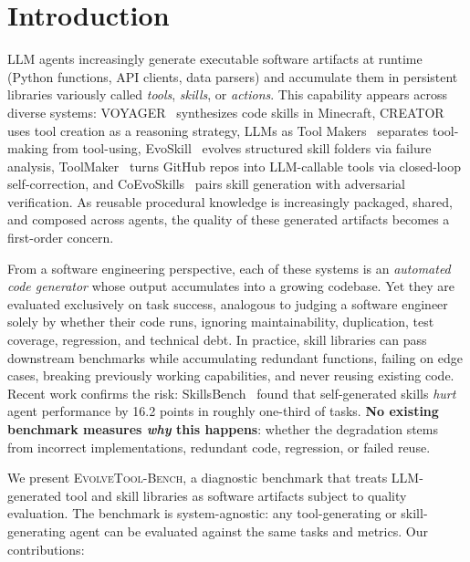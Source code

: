 \documentclass[sigconf,anonymous,review,natbib=false]{acmart}
\begin{document}
\maketitle

\section{Introduction}

LLM agents increasingly generate executable software artifacts at runtime (Python functions, API clients, data parsers) and accumulate them in persistent libraries variously called \emph{tools}, \emph{skills}, or \emph{actions}. This capability appears across diverse systems: VOYAGER~\cite{wang2023voyager} synthesizes code skills in Minecraft, CREATOR~\cite{qian2023creator} uses tool creation as a reasoning strategy, LLMs as Tool Makers~\cite{cai2023latm} separates tool-making from tool-using, EvoSkill~\cite{alzubi2026evoskill} evolves structured skill folders via failure analysis, ToolMaker~\cite{wolflein2025toolmaker} turns GitHub repos into LLM-callable tools via closed-loop self-correction, and CoEvoSkills~\cite{zhang2026coevoskills} pairs skill generation with adversarial verification. As reusable procedural knowledge is increasingly packaged, shared, and composed across agents, the quality of these generated artifacts becomes a first-order concern.

From a software engineering perspective, each of these systems is an \emph{automated code generator} whose output accumulates into a growing codebase. Yet they are evaluated exclusively on task success, analogous to judging a software engineer solely by whether their code runs, ignoring maintainability, duplication, test coverage, regression, and technical debt. In practice, skill libraries can pass downstream benchmarks while accumulating redundant functions, failing on edge cases, breaking previously working capabilities, and never reusing existing code. Recent work confirms the risk: SkillsBench~\cite{skillsbench2026} found that self-generated skills \emph{hurt} agent performance by 16.2 points in roughly one-third of tasks. \textbf{No existing benchmark measures \emph{why} this happens}: whether the degradation stems from incorrect implementations, redundant code, regression, or failed reuse.

We present \textsc{EvolveTool-Bench}, a diagnostic benchmark that treats LLM-generated tool and skill libraries as software artifacts subject to quality evaluation. The benchmark is system-agnostic: any tool-generating or skill-generating agent can be evaluated against the same tasks and metrics. Our contributions:
\end{document}
